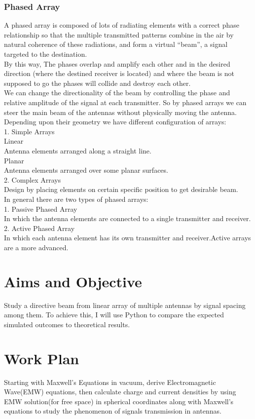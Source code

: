 \documentclass[a4paper, twoside] {thesis}
\begin{document}
\subsubsection{Phased Array}
A phased array is composed of lots of radiating elements with a correct phase relationship so that the multiple transmitted patterns combine in the air by natural coherence of these radiations, and form a virtual “beam”, a signal targeted to the destination.\\
By this way, The phases overlap and amplify each other and in the desired direction (where the destined receiver is located) and where the beam is not supposed to go the phases will collide and destroy each other.\\
We can change the directionality of the beam by controlling the phase and relative amplitude of the signal at each transmitter. So by phased arrays we can steer the main beam of the antennas without physically moving the antenna.\\
Depending upon their geometry we have different configuration of arrays:\\
1. Simple Arrays\\
 Linear\\
  Antenna elements arranged along a straight line.\\
 Planar\\
  Antenna elements arranged over some planar surfaces.\\
2. Complex Arrays\\
Design by placing elements on certain specific position to get desirable beam.\\
In general there are two types of phased arrays:\\
1. Passive Phased Array\\
In which the antenna elements are connected to a single transmitter and receiver.\\
2. Active Phased Array\\
In which each antenna element has its own transmitter and receiver.Active arrays are a more advanced.

\section{Aims and Objective}
Study a directive beam from linear array of multiple antennas by signal spacing among them. 
To achieve this, I will use Python to compare the expected simulated outcomes to theoretical results.

\section{Work Plan}
Starting with Maxwell's Equations in vacuum, derive Electromagnetic Wave(EMW) equations, then calculate charge and current densities by using EMW solution(for free space) in spherical coordinates along with Maxwell's equations to study the phenomenon of signals transmission in antennas.
\end{document}
